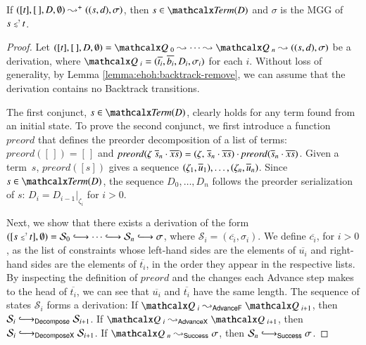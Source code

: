 \begin{lemma}\label{lemma:ehoh:pdt-soundi}
  If $([t], [\,], D, \emptyset) \leadsto^+ ((s, d), \sigma)$, then $s \in \Term(D)$
  and $\sigma$ is the MGG of $s \mathrel{{\scriptstyle\lesssim}^{\scriptscriptstyle{?\!}}} t$.
  \end{lemma}
  
  \begin{proof}
  Let $([t], [\,], D, \emptyset) =
  \quadruple{}_{\,\,0} \Pdtarrow \cdots \Pdtarrow \quadruple{}_{\,\,n}
  \Pdtarrow ((s, d), \sigma)$ be a derivation, where $\quadruple{}_{\,\,i} =
  (\overline{t_i}, \overline{b_i},\allowbreak D_i, \sigma_i)$ for each $i$. Without loss of
  generality, by Lemma \ref{lemma:ehoh:backtrack-remove}, we can assume that the
  derivation contains no \textsf{Backtrack} transitions.
  
  The first conjunct, $s \in \Term(D)$, clearly holds
  for any term found
  from an initial state. To prove the second conjunct, we first introduce a
  function $\mathit{preord}$ that defines the preorder decomposition of a list
  of terms:
  $\mathit{preord}([\,]) = [\,]$ and
  $\mathit{preord}(\zeta \; \overline{s}_{n} \cdot \overline{xs}) =
  (\zeta{,}\; \overline{s}_{n} \cdot \overline{xs}) \cdot \mathit{preord}(\overline{s}_{n} \cdot \overline{xs})$.
  Given a term~$s$, $\mathit{preord}([s])$ gives a sequence
  $(\zeta_1, \overline{u}_{1}), \dots, \allowbreak
  (\zeta_n, \overline{u}_{n})$.
  Since $s \in \Term(D)$,
  the sequence $D_0, \ldots, D_n$ follows the preorder serialization of $s$:
  $D_i = D_{i-1}|_{\zeta_i}$ for $i > 0$.
  
  Next, we show that there exists a derivation of the form
  $([s \MATCH t], \emptyset) = \mathcal{S}_0 \Matchiiarrow
  \cdots \Matchiiarrow \mathcal{S}_n \Matchiiarrow \sigma$, where
  $\mathcal{S}_i = (\overline{c_i}, \sigma_i)$. We define $\overline{c_i}$, for $i>0$,
  as the list of constraints whose left-hand sides are the elements of $\overline{u_i}$
  and right-hand sides are the elements of $\overline{t_i}$, in the order they appear in the respective lists.
  By inspecting the definition of $\mathit{preord}$
  and the changes each \textsf{Advance} step makes
  to the head of $\overline{t_i}$, we can see that $\overline{u_i}$ and $\overline{t_i}$  have the same length.
  The sequence of states $\mathcal{S}_i$ forms a derivation:
  If $\quadruple{}_{\,\,i} \Pdtarrow_\textsf{AdvanceF} \quadruple{}_{\,\,i+1}$, then $\mathcal{S}_i \Matchiiarrow_\textsf{Decompose} \mathcal{S}_{i+1}$.
  If $\quadruple{}_{\,\,i} \Pdtarrow_\textsf{AdvanceX} \quadruple{}_{\,\,i+1}$, then $\mathcal{S}_i\allowbreak \Matchiiarrow_\textsf{DecomposeX} \mathcal{S}_{i+1}$.
  If $\quadruple{}_{\,\,n} \Pdtarrow_\textsf{Success} \sigma$, then
  $\mathcal{S}_n\allowbreak \Matchiiarrow_\textsf{Success} \sigma$.
\end{proof}
  
